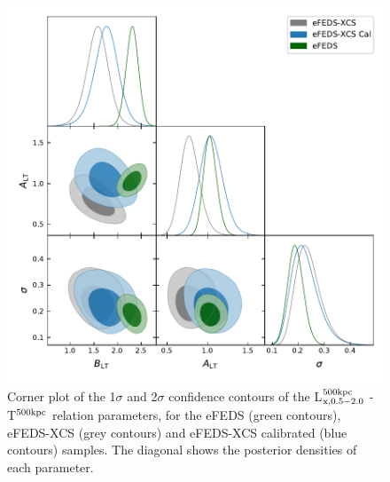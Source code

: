\documentclass[fleqn,usenatbib]{mnras}
\begin{document}
\begin{figure}
    \centering
    \includegraphics[width=1\columnwidth]{images/lt52_corner.pdf}
    \caption[]{Corner plot of the 1$\sigma$ and 2$\sigma$ confidence contours of the L$^{500\rm{kpc}}_{\rm{x, 0.5-2.0}}$ - T$^{500\rm{kpc}}$ relation parameters, for the eFEDS (green contours), eFEDS-XCS (grey contours) and eFEDS-XCS calibrated (blue contours) samples.  The diagonal shows the posterior densities of each parameter.}
    \label{fig:ltcorner}
\end{figure}



\end{document}
